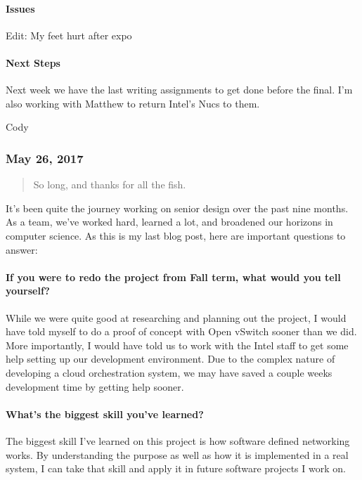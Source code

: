 \documentclass[10pt,onecolumn,journal,draftclsnofoot]{IEEEtran}
\begin{document}
\paragraph{Issues} 

Edit: My feet hurt after expo

\paragraph{Next Steps} 

Next week we have the last writing assignments to get done before the
final. I'm also working with Matthew to return Intel's Nucs to them.

Cody

\subsubsection{May 26, 2017} 

\begin{quote}
So long, and thanks for all the fish.
\end{quote}

It's been quite the journey working on senior design over the past nine
months. As a team, we've worked hard, learned a lot, and broadened our
horizons in computer science. As this is my last blog post, here are
important questions to answer:

\paragraph{If you were to redo the project from Fall term, what would you tell
yourself?}

While we were quite good at researching and planning out the project, I
would have told myself to do a proof of concept with Open vSwitch sooner
than we did. More importantly, I would have told us to work with the
Intel staff to get some help setting up our development environment. Due
to the complex nature of developing a cloud orchestration system, we may
have saved a couple weeks development time by getting help sooner.

\paragraph{What's the biggest skill you've learned?}

The biggest skill I've learned on this project is how software defined
networking works. By understanding the purpose as well as how it is
implemented in a real system, I can take that skill and apply it in
future software projects I work on.
\end{document}
